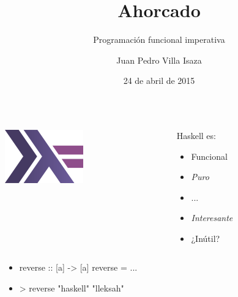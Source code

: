 \documentclass[spanish]{beamer}
\title{Ahorcado}
\subtitle{Programación funcional imperativa}
\author{Juan Pedro Villa Isaza}
\institute{Stack Builders}
\date{24 de abril de 2015}
\begin{document}

\frame{\titlepage}


\begin{frame}
  \begin{columns}[onlytextwidth,T]
    \begin{column}{.5\textwidth}
      \begin{center}
        \includegraphics[scale=0.8]{haskell.png}
      \end{center}
    \end{column}
    \begin{column}{.5\textwidth}
      Haskell es:
      \begin{itemize}
      \item<1-> Funcional
      \item<1-> \emph{Puro}
      \item<1-> ...
      \item<2-> \emph{Interesante}
      \item<3-> ¿\alert{Inútil}?
      \end{itemize}
    \end{column}
  \end{columns}
\end{frame}


\begin{frame}[fragile]
  \begin{itemize}
  \item
    \begin{code}
reverse :: [a] -> [a]
reverse = ...
    \end{code}
  \item
    \begin{code}
> reverse "haskell"
"lleksah"
    \end{code}
  \end{itemize}
\end{frame}

\end{document}
